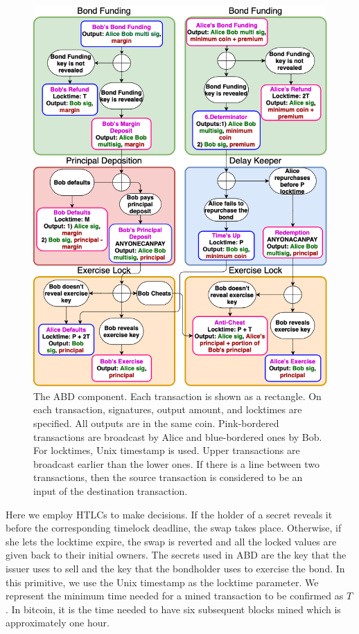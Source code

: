\begin{figure}[h]
  \centering
  \includegraphics[width=\linewidth]{figures/bond-first.png}
  \caption{The ABD component. Each transaction is shown as a rectangle. On each transaction, signatures, output amount, and locktimes are specified. All outputs are in the same coin. Pink-bordered transactions are broadcast by Alice and blue-bordered ones by Bob. For locktimes, Unix timestamp is used. Upper transactions are broadcast earlier than the lower ones. If there is a line between two transactions, then the source transaction is considered to be an input of the destination transaction.}
  \label{fig:non-collat-bond-no-checkseq}
\end{figure}

Here\new{,} we employ HTLCs to make decisions. If the holder of a secret reveals it before the corresponding timelock deadline, the swap takes place. Otherwise, if she lets the locktime expire, the swap is reverted and all the locked values are given back to their initial owners. The secrets used in ABD are the {\it \Aone} key that the issuer uses to sell and the {\it \keyone} key that the bondholder uses to exercise the bond. In this primitive, we use the Unix timestamp as the locktime parameter. We represent the minimum time needed for a mined transaction to be confirmed as $T$. In bitcoin, it is the time needed to have six subsequent blocks mined which is approximately one hour.


